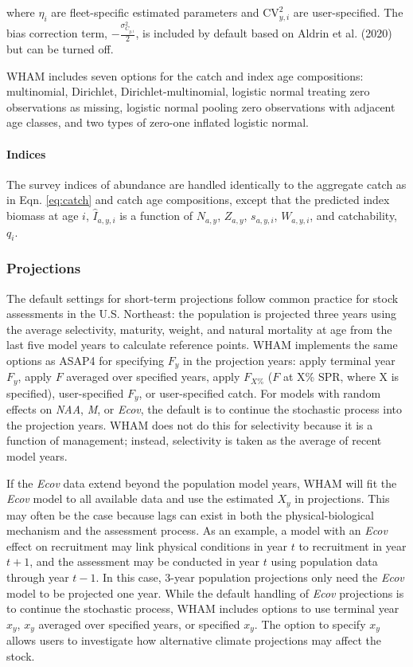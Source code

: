 \documentclass[]{article}
\let\oldparagraph\paragraph
\renewcommand{\paragraph}[1]{\oldparagraph{#1}\mbox{}}
\begin{document}
where \(\eta_i\) are fleet-specific estimated parameters and
\(\text{CV}^2_{y,i}\) are user-specified. The bias correction term,
\(- \frac{\sigma^2_{C_{y,i}}}{2}\), is included by default based on
Aldrin et al. (2020) but can be turned off.

WHAM includes seven options for the catch and index age compositions:
multinomial, Dirichlet, Dirichlet-multinomial, logistic normal treating
zero observations as missing, logistic normal pooling zero observations
with adjacent age classes, and two types of zero-one inflated logistic
normal.

\hypertarget{indices}{%
\paragraph{Indices}\label{indices}}

The survey indices of abundance are handled identically to the aggregate
catch as in Eqn. \ref{eq:catch} and catch age compositions, except that
the predicted index biomass at age \(i\), \(\hat{I}_{a,y,i}\) is a
function of \(N_{a,y}\), \(Z_{a,y}\), \(s_{a,y,i}\), \(W_{a,y,i}\), and
catchability, \(q_i\).

\hypertarget{projections}{%
\subsubsection{Projections}\label{projections}}

The default settings for short-term projections follow common practice
for stock assessments in the U.S. Northeast: the population is projected
three years using the average selectivity, maturity, weight, and natural
mortality at age from the last five model years to calculate reference
points. WHAM implements the same options as ASAP4 for specifying \(F_y\)
in the projection years: apply terminal year \(F_y\), apply \(F\)
averaged over specified years, apply \(F_{X\%}\) (\(F\) at X\% SPR,
where X is specified), user-specified \(F_y\), or user-specified catch.
For models with random effects on \emph{NAA}, \emph{M}, or \emph{Ecov},
the default is to continue the stochastic process into the projection
years. WHAM does not do this for selectivity because it is a function of
management; instead, selectivity is taken as the average of recent model
years.

If the \emph{Ecov} data extend beyond the population model years, WHAM
will fit the \emph{Ecov} model to all available data and use the
estimated \(X_y\) in projections. This may often be the case because
lags can exist in both the physical-biological mechanism and the
assessment process. As an example, a model with an \emph{Ecov} effect on
recruitment may link physical conditions in year \(t\) to recruitment in
year \(t+1\), and the assessment may be conducted in year \(t\) using
population data through year \(t-1\). In this case, 3-year population
projections only need the \emph{Ecov} model to be projected one year.
While the default handling of \emph{Ecov} projections is to continue the
stochastic process, WHAM includes options to use terminal year \(x_y\),
\(x_y\) averaged over specified years, or specified \(x_y\). The option
to specify \(x_y\) allows users to investigate how alternative climate
projections may affect the stock.
\end{document}
